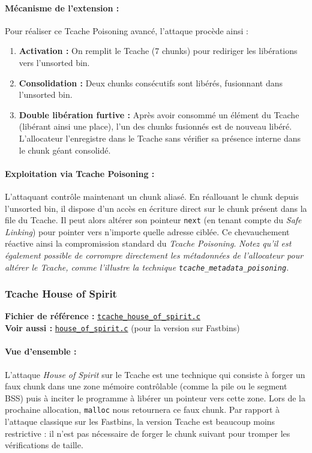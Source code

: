 \paragraph{Mécanisme de l'extension :}
Pour réaliser ce Tcache Poisoning avancé, l'attaque procède ainsi :
\begin{enumerate}
    \item \textbf{Activation :} On remplit le Tcache (7 chunks) pour rediriger les libérations vers l'unsorted bin.
    \item \textbf{Consolidation :} Deux chunks consécutifs sont libérés, fusionnant dans l'unsorted bin.
    \item \textbf{Double libération furtive :} Après avoir consommé un élément du Tcache (libérant ainsi une place), l'un des chunks fusionnés est de nouveau libéré. L'allocateur l'enregistre dans le Tcache sans vérifier sa présence interne dans le chunk géant consolidé.
\end{enumerate}

\paragraph{Exploitation via Tcache Poisoning :}
L'attaquant contrôle maintenant un chunk aliasé. En réallouant le chunk depuis l'unsorted bin, il dispose d'un accès en écriture direct sur le chunk présent dans la file du Tcache. Il peut alors altérer son pointeur \texttt{next} (en tenant compte du \textit{Safe Linking}) pour pointer vers n'importe quelle adresse ciblée. Ce chevauchement réactive ainsi la compromission standard du \textit{Tcache Poisoning}. \textit{Notez qu'il est également possible de corrompre directement les métadonnées de l'allocateur pour altérer le Tcache, comme l'illustre la technique \texttt{tcache\_metadata\_poisoning}.}


\subsubsection{Tcache House of Spirit}

\noindent\textbf{Fichier de référence :} \href{https://github.com/shellphish/how2heap/blob/master/glibc_2.41/tcache_house_of_spirit.c}{\texttt{tcache\_house\_of\_spirit.c}}\\
\noindent\textbf{Voir aussi :} \href{https://github.com/shellphish/how2heap/blob/master/glibc_2.41/house_of_spirit.c}{\texttt{house\_of\_spirit.c}} (pour la version sur Fastbins)

\paragraph{Vue d'ensemble :}
L'attaque \textit{House of Spirit} sur le Tcache est une technique qui consiste à forger un faux chunk dans une zone mémoire contrôlable (comme la pile ou le segment BSS) puis à inciter le programme à libérer un pointeur vers cette zone. Lors de la prochaine allocation, \texttt{malloc} nous retournera ce faux chunk. Par rapport à l'attaque classique sur les Fastbins, la version Tcache est beaucoup moins restrictive : il n'est pas nécessaire de forger le chunk suivant pour tromper les vérifications de taille.

